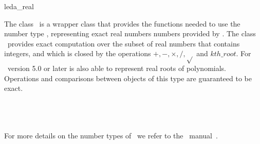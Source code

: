 \ccDefGlobalScope{}
\begin{ccRefClass}{leda_real}

\ccDefinition

The class \ccRefName\ is a wrapper class that provides the functions needed
to use the number type , representing exact real numbers
numbers provided by \leda. 
The class \ccRefName\ provides exact computation over the subset of real
numbers that contains integers, and which is closed by the operations
$+,-,\times,/,\sqrt{}$ and $kth\_root$. For \leda\ version 5.0 or later 
 is also able to represent real roots of polynomials. 
Operations and comparisons between objects of this type are guaranteed 
to be exact.


\ccIsModel
{}\\
\\
\\

For more details on the number types of \leda\ we refer to the \leda\
manual~\cite{cgal:mnsu-lum}.

\end{ccRefClass}
